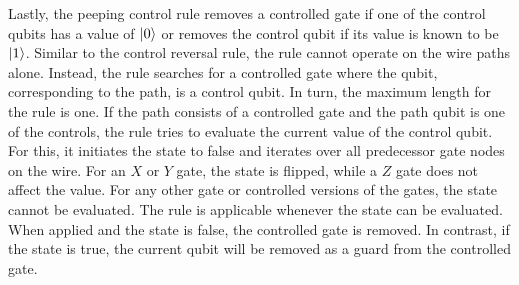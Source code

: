 Lastly, the peeping control rule removes a controlled gate if one of the control qubits has a value of $\ket{0}$ or removes the control qubit if its value is known to be $\ket{1}$. Similar to the control reversal rule, the rule cannot operate on the wire paths alone. Instead, the rule searches for a controlled gate where the qubit, corresponding to the path, is a control qubit. In turn, the maximum length for the rule is one. If the path consists of a controlled gate and the path qubit is one of the controls, the rule tries to evaluate the current value of the control qubit. For this, it initiates the state to false and iterates over all predecessor gate nodes on the wire. For an $X$ or $Y$ gate, the state is flipped, while a $Z$ gate does not affect the value. For any other gate or controlled versions of the gates, the state cannot be evaluated. The rule is applicable whenever the state can be evaluated. When applied and the state is false, the controlled gate is removed. In contrast, if the state is true, the current qubit will be removed as a guard from the controlled gate.